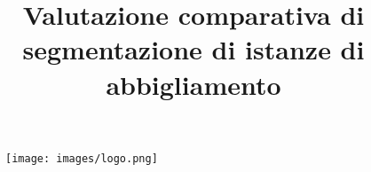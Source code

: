 \documentclass[12pt,a4paper,oneside,openright]{book}
\begin{document}
\begin{figure}
	\centering
	\texttt{[image: images/logo.png]}
\end{figure}

\title{Valutazione comparativa di segmentazione di istanze di abbigliamento}

\providecommand{\entitle}{Comparative evaluation of instance-based apparel segmentation}

\providecommand{\autore}{Pier Carlo Cadoppi}                        %
\providecommand{\matricola}{276645}
\providecommand{\principaladviser}{Chiar.mo~Prof. Andrea Prati}  %
\providecommand{\firstreader}{Leonardo Rossi}            %
\providecommand{\annoacc}{2018/19}
\providecommand{\tipo}{Triennale} %
\providecommand{\corso}{Informatica, Elettronica e delle Telecomunicazioni} %
\providecommand{\subtitle}{Detecting clothing and footwear in real world images} %


\titlep

\frontmatter

   
   \tableofcontents
   \listoffigures
   \listoftables

\clearpage

\mainmatter
 
 
 
 
 
 

\appendix
\renewcommand{\chaptermark}[1]{\markboth{{\appendixname}\ \thechapter.\hspace{1em}#1}{}}

\clearpage
{}

%



\end{document}
